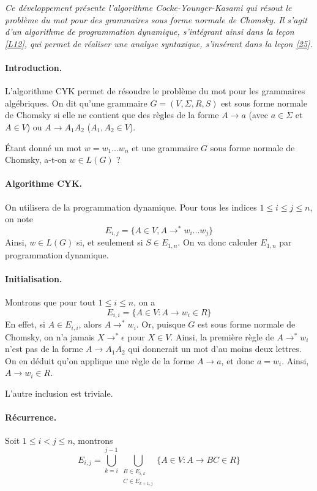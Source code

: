
\textit{
Ce développement présente l'algorithme Cocke-Younger-Kasami qui résout le problème du mot pour des grammaires sous forme normale de Chomsky. Il s'agit d'un algorithme de programmation dynamique, s'intégrant ainsi dans la leçon \ref{L12}, qui permet de réaliser une analyse syntaxique, s'insérant dans la leçon \ref{25}.
}

\paragraph{Introduction.} L'algorithme CYK permet de résoudre le problème du mot pour les grammaires algébriques.
On dit qu'une grammaire $G=(V,\Sigma, R,S)$ est sous forme normale de Chomsky si elle ne contient que des règles de la forme $A\rightarrow a$ (avec $a\in \Sigma$ et $A\in V$) ou $A\rightarrow A_1A_2$ ($A_1,A_2\in V$).

\begin{definition}
Étant donné un mot $w=w_1...w_n$ et une grammaire $G$ sous forme normale de Chomsky, a-t-on $w\in L(G)$ ?
\end{definition}

\paragraph{Algorithme CYK.} On utilisera de la programmation dynamique. Pour tous les indices $1\leq i\leq j\leq n$, on note 
$$
E_{i,j} = \{A\in V, A\rightarrow^* w_i...w_j \}
$$ 
Ainsi, $w\in L(G)$ si, et seulement si $S\in E_{1,n}$. On va donc calculer $E_{1,n}$ par programmation dynamique.

\paragraph{Initialisation.} Montrons que pour tout $1\leq i \leq n$, on a 
$$
E_{i,i} = \{A\in V : A\rightarrow w_i \in R\}
$$
En effet, si $A\in E_{i,i}$, alors $A\rightarrow^* w_i$. Or, puisque $G$ est sous forme normale de Chomsky, on n'a jamais $X\rightarrow^*\epsilon$ pour $X\in V$. Ainsi, la première règle de $A\rightarrow^*w_i$ n'est pas de la forme $A\rightarrow A_1A_2$ qui donnerait un mot d'au moins deux lettres. On en déduit qu'on applique une règle de la forme $A\rightarrow a$, et donc $a=w_i$. Ainsi, $A\rightarrow w_i \in R$. 

L'autre inclusion est triviale.


\paragraph{Récurrence.} Soit $1\leq i < j \leq n$, montrons 
$$
E_{i,j} = \bigcup_{k=i}^{j-1} \bigcup_{\begin{smallmatrix} B\in E_{i,k} \\ C\in E_{k+1,j} \end{smallmatrix}} \{ A\in V : A\rightarrow BC \in R\}
$$ 

